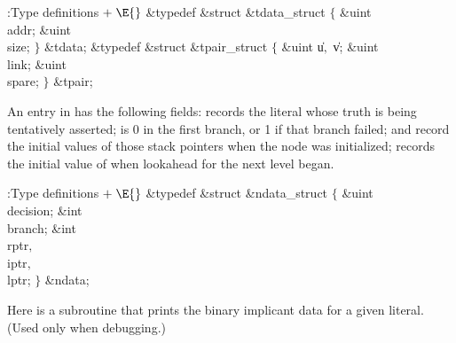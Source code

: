 \Y\B\4:Type definitions\X${}\mathrel+\E{}$\6
\&{typedef} \&{struct} \&{tdata\_struct} ${}\{{}$\1\6
\&{uint} \\{addr};\6
\&{uint} \\{size};\2\6
${}\}{}$ \&{tdata};\6
\&{typedef} \&{struct} \&{tpair\_struct} ${}\{{}$\1\6
\&{uint} \|u${},{}$ \|v;\6
\&{uint} \\{link};\6
\&{uint} \\{spare};\2\6
${}\}{}$ \&{tpair};\par
\fi

An entry in  has the following fields:
 records the literal whose truth is being tentatively
asserted;
 is 0 in the first branch, or 1 if that branch failed;
 and  record the initial values of those stack
pointers
when the node was initialized;
 records the initial value of  when lookahead for the
next level began.

\Y\B\4:Type definitions\X${}\mathrel+\E{}$\6
\&{typedef} \&{struct} \&{ndata\_struct} ${}\{{}$\1\6
\&{uint} \\{decision};\6
\&{int} \\{branch};\6
\&{int} \\{rptr}${},{}$ \\{iptr}${},{}$ \\{lptr};\2\6
${}\}{}$ \&{ndata};\par
\fi

Here is a subroutine that prints the binary implicant data
for
a given literal. (Used only when debugging.)

